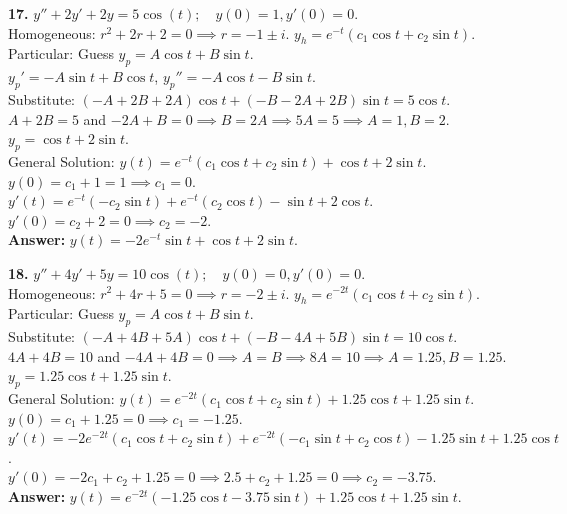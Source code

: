 \documentclass[11pt]{article}
\begin{document}
\textbf{17.} $y'' + 2y' + 2y = 5 \cos(t); \quad y(0) = 1, y'(0) = 0$. \\
Homogeneous: $r^2 + 2r + 2 = 0 \implies r = -1 \pm i$. $y_h = e^{-t}(c_1 \cos t + c_2 \sin t)$. \\
Particular: Guess $y_p = A \cos t + B \sin t$. \\
$y_p' = -A \sin t + B \cos t$, $y_p'' = -A \cos t - B \sin t$. \\
Substitute: $(-A + 2B + 2A)\cos t + (-B - 2A + 2B)\sin t = 5 \cos t$. \\
$A + 2B = 5$ and $-2A + B = 0 \implies B = 2A \implies 5A = 5 \implies A=1, B=2$. \\
$y_p = \cos t + 2 \sin t$. \\
General Solution: $y(t) = e^{-t}(c_1 \cos t + c_2 \sin t) + \cos t + 2 \sin t$. \\
$y(0) = c_1 + 1 = 1 \implies c_1 = 0$. \\
$y'(t) = e^{-t}(-c_2 \sin t) + e^{-t}(c_2 \cos t) - \sin t + 2 \cos t$. \\
$y'(0) = c_2 + 2 = 0 \implies c_2 = -2$. \\
\textbf{Answer:} $y(t) = -2e^{-t}\sin t + \cos t + 2 \sin t$.

\vspace{0.5cm}
\textbf{18.} $y'' + 4y' + 5y = 10 \cos(t); \quad y(0) = 0, y'(0) = 0$. \\
Homogeneous: $r^2 + 4r + 5 = 0 \implies r = -2 \pm i$. $y_h = e^{-2t}(c_1 \cos t + c_2 \sin t)$. \\
Particular: Guess $y_p = A \cos t + B \sin t$. \\
Substitute: $(-A + 4B + 5A)\cos t + (-B - 4A + 5B)\sin t = 10 \cos t$. \\
$4A + 4B = 10$ and $-4A + 4B = 0 \implies A = B \implies 8A = 10 \implies A = 1.25, B = 1.25$. \\
$y_p = 1.25 \cos t + 1.25 \sin t$. \\
General Solution: $y(t) = e^{-2t}(c_1 \cos t + c_2 \sin t) + 1.25 \cos t + 1.25 \sin t$. \\
$y(0) = c_1 + 1.25 = 0 \implies c_1 = -1.25$. \\
$y'(t) = -2e^{-2t}(c_1 \cos t + c_2 \sin t) + e^{-2t}(-c_1 \sin t + c_2 \cos t) - 1.25 \sin t + 1.25 \cos t$. \\
$y'(0) = -2c_1 + c_2 + 1.25 = 0 \implies 2.5 + c_2 + 1.25 = 0 \implies c_2 = -3.75$. \\
\textbf{Answer:} $y(t) = e^{-2t}(-1.25 \cos t - 3.75 \sin t) + 1.25 \cos t + 1.25 \sin t$.
\end{document}
